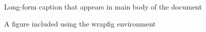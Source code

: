 \begin{figure}[ht!]

\centering


\caption[Short-form caption]{Long-form caption that appears in main body of the document}

\label{fig:aFigure}
\end{figure}



\begin{wrapfigure}[11]{r}{0.45\textwidth}
\centering
\vspace{-.1\baselineskip}
\caption[Another short-form caption]{A figure included using the wrapfig environment}
\label{fig:anotherFigure}
\end{wrapfigure}

